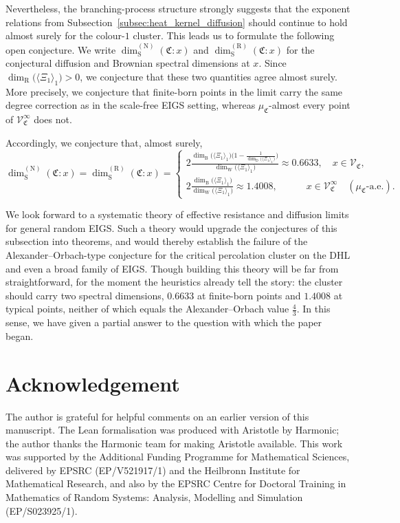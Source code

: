 \documentclass{article}
\theoremstyle{plain}
\theoremstyle{definition}
\newcommand{\dimbox}{\dim_\mathrm{B}}
\newcommand{\dimdeg}{\dim_\mathrm{D}}
\newcommand{\dimwalk}{\dim_\mathrm{W}}
\newcommand{\dimresis}{\dim_\mathrm{R}}
\newcommand{\dimspec}{\dim_\mathrm{S}}
\begin{document}
Nevertheless, the branching-process structure strongly suggests that the exponent relations from Subsection~\ref{subsec:heat_kernel_diffusion} should continue to hold almost surely for the colour-$1$ cluster.
This leads us to formulate the following open conjecture.
We write $\dimspec^{(\mathrm N)}(\mathfrak C:x)$ and $\dimspec^{(\mathrm R)}(\mathfrak C:x)$ for the conjectural diffusion and Brownian spectral dimensions at $x$.
Since $\dimresis\big(\langle \Xi_1\rangle_1\big)>0$, we conjecture that these two quantities agree almost surely.
More precisely, we conjecture that finite-born points in the limit carry the same degree correction as in the scale-free EIGS setting, whereas $\mu_{\mathfrak C}$-almost every point of $\mathscr V_{\mathfrak C}^{\infty}$ does not.

Accordingly, we conjecture that, almost surely,
\[
\dimspec^{(\mathrm N)}(\mathfrak C:x)
=
\dimspec^{(\mathrm R)}(\mathfrak C:x)
=
\begin{cases}
\displaystyle
2\frac{\dimbox\big(\langle \Xi_1\rangle_1\big)\bigl(1-\frac{1}{\dimdeg\big(\langle \Xi_1\rangle_1\big)}\bigr)}{\dimwalk\big(\langle \Xi_1\rangle_1\big)}
\approx 0.6633,
\quad
x\in \mathscr V_{\mathfrak C},
\\[3mm]
\displaystyle
2\frac{\dimbox\big(\langle \Xi_1\rangle_1\big)}{\dimwalk\big(\langle \Xi_1\rangle_1\big)}
\approx 1.4008,
\quad\qquad
x\in \mathscr V_{\mathfrak C}^{\infty}
\quad
(\mu_{\mathfrak C}\text{-a.e.}).
\end{cases}
\]


We look forward to a systematic theory of effective resistance and diffusion limits for general random EIGS.
Such a theory would upgrade the conjectures of this subsection into theorems, and would thereby establish the failure of the Alexander--Orbach-type conjecture for the critical percolation cluster on the DHL and even a broad family of EIGS.
Though building this theory will be far from straightforward, for the moment the heuristics already tell the story: the cluster should carry two spectral dimensions, $0.6633$ at finite-born points and $1.4008$ at typical points, neither of which equals the Alexander--Orbach value $\frac43$.
In this sense, we have given a partial answer to the question with which the paper began.


\section*{Acknowledgement}
The author is grateful for helpful comments on an earlier version of this manuscript.
The Lean formalisation was produced with Aristotle by Harmonic; the author thanks the Harmonic team for making Aristotle available.
This work was supported by the Additional Funding Programme for Mathematical Sciences, delivered by EPSRC (EP/V521917/1) and the Heilbronn Institute for Mathematical Research,
and also by the EPSRC Centre for Doctoral Training in Mathematics of Random Systems: Analysis, Modelling and Simulation (EP/S023925/1).





\end{document}
